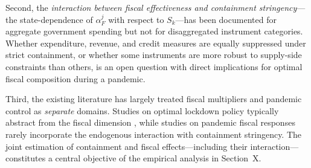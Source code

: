 Second, the \textit{interaction between fiscal effectiveness and containment stringency}---the state-dependence of $\alpha_F^j$ with respect to $S_k$---has been documented for aggregate government spending \citep{auerbach2022} but not for disaggregated instrument categories. Whether expenditure, revenue, and credit measures are equally suppressed under strict containment, or whether some instruments are more robust to supply-side constraints than others, is an open question with direct implications for optimal fiscal composition during a pandemic.

Third, the existing literature has largely treated fiscal multipliers and pandemic control as \textit{separate} domains. Studies on optimal lockdown policy typically abstract from the fiscal dimension \citep{alvarez2021, acemoglu2021}, while studies on pandemic fiscal responses rarely incorporate the endogenous interaction with containment stringency. The joint estimation of containment and fiscal effects---including their interaction---constitutes a central objective of the empirical analysis in Section~X.














